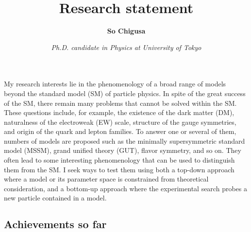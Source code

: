 \documentclass[12pt,notitlepage]{article}
\title{\vspace*{-3cm}Research statement}
\author{\textbf{So Chigusa}}
\date{\vspace*{-4mm}\textit{Ph.D. candidate in Physics at University of Tokyo}}
\begin{document}
\maketitle

My research interests lie in the phenomenology of a broad range of models beyond the standard model (SM) of particle physics.
In spite of the great success of the SM, there remain many problems that cannot be solved within the SM.
These questions include, for example, the existence of the dark matter (DM), naturalness of the electroweak (EW) scale, structure of the gauge symmetries, and origin of the quark and lepton families.
To answer one or several of them, numbers of models are proposed such as the minimally supersymmetric standard model (MSSM), grand unified theory (GUT), flavor symmetry, and so on.
They often lead to some interesting phenomenology that can be used to distinguish them from the SM.
I seek ways to test them using both a top-down approach where a model or its parameter space is constrained from theoretical consideration, and a bottom-up approach where the experimental search probes a new particle contained in a model.

\vspace*{-2mm}
\subsection*{Achievements so far}

\end{document}
